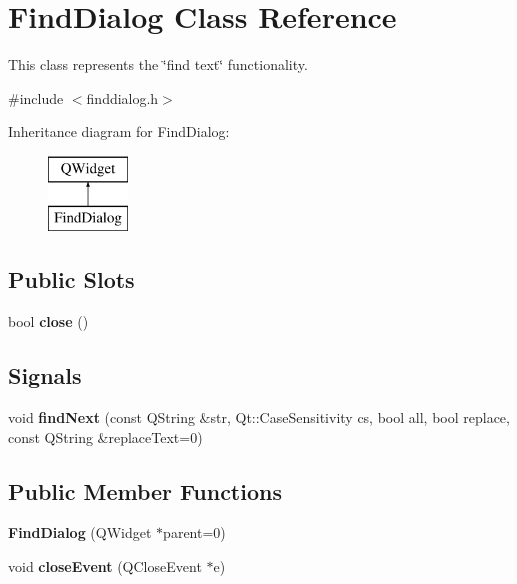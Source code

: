 \hypertarget{class_find_dialog}{}\section{Find\+Dialog Class Reference}
\label{class_find_dialog}


This class represents the \char`\"{}find text\char`\"{} functionality.  




{\ttfamily \#include $<$finddialog.\+h$>$}

Inheritance diagram for Find\+Dialog\+:\begin{figure}[H]
\begin{center}
\leavevmode
\includegraphics[height=2.000000cm]{class_find_dialog}
\end{center}
\end{figure}
\subsection*{Public Slots}
\begin{DoxyCompactItemize}
\item 
\hypertarget{class_find_dialog_a4c4a3771fb980ba9c69ca6a67f0e0064}{}bool {\bfseries close} ()\label{class_find_dialog_a4c4a3771fb980ba9c69ca6a67f0e0064}

\end{DoxyCompactItemize}
\subsection*{Signals}
\begin{DoxyCompactItemize}
\item 
\hypertarget{class_find_dialog_a3046657833c8120339f3a03444f8e5ff}{}void {\bfseries find\+Next} (const Q\+String \&str, Qt\+::\+Case\+Sensitivity cs, bool all, bool replace, const Q\+String \&replace\+Text=0)\label{class_find_dialog_a3046657833c8120339f3a03444f8e5ff}

\end{DoxyCompactItemize}
\subsection*{Public Member Functions}
\begin{DoxyCompactItemize}
\item 
\hypertarget{class_find_dialog_af9dc0e86bec39e9b3a0b954a603a8e76}{}{\bfseries Find\+Dialog} (Q\+Widget $\ast$parent=0)\label{class_find_dialog_af9dc0e86bec39e9b3a0b954a603a8e76}

\item 
\hypertarget{class_find_dialog_a966e7ab89d607dbff17d17a95f102587}{}void {\bfseries close\+Event} (Q\+Close\+Event $\ast$e)\label{class_find_dialog_a966e7ab89d607dbff17d17a95f102587}

\end{DoxyCompactItemize}
